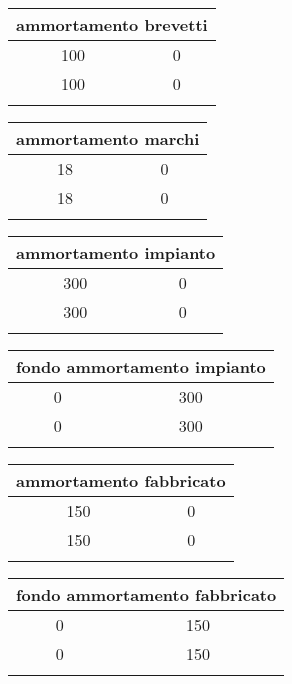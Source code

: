 \documentclass[twocolumn]{article}
\begin{document}
\begin{table}[ht]\centering 
\begin{tabular}{|c|c|}
\hline
\multicolumn{2}{|c|}{ammortamento brevetti} \\ 
\hline  \hline 
100 & 0 \\ 
\hline
100 & 0 \\ 
 \\ 
\hline
\end{tabular} \end{table} 
\begin{table}[ht]\centering 
\begin{tabular}{|c|c|}
\hline
\multicolumn{2}{|c|}{ammortamento marchi} \\ 
\hline  \hline 
18 & 0 \\ 
\hline
18 & 0 \\ 
 \\ 
\hline
\end{tabular} \end{table} 
\begin{table}[ht]\centering 
\begin{tabular}{|c|c|}
\hline
\multicolumn{2}{|c|}{ammortamento impianto} \\ 
\hline  \hline 
300 & 0 \\ 
\hline
300 & 0 \\ 
 \\ 
\hline
\end{tabular} \end{table} 
\begin{table}[ht]\centering 
\begin{tabular}{|c|c|}
\hline
\multicolumn{2}{|c|}{fondo ammortamento impianto} \\ 
\hline  \hline 
0 & 300 \\ 
\hline
0 & 300 \\ 
 \\ 
\hline
\end{tabular} \end{table} 
\begin{table}[ht]\centering 
\begin{tabular}{|c|c|}
\hline
\multicolumn{2}{|c|}{ammortamento fabbricato} \\ 
\hline  \hline 
150 & 0 \\ 
\hline
150 & 0 \\ 
 \\ 
\hline
\end{tabular} \end{table} 
\begin{table}[ht]\centering 
\begin{tabular}{|c|c|}
\hline
\multicolumn{2}{|c|}{fondo ammortamento fabbricato} \\ 
\hline  \hline 
0 & 150 \\ 
\hline
0 & 150 \\ 
 \\ 
\hline
\end{tabular} \end{table} 
\end{document}
